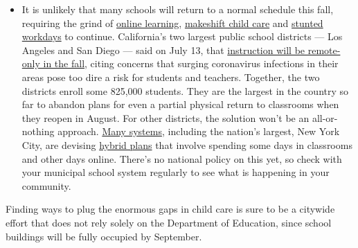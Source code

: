 \begin{itemize}
  \begin{itemize}
  \tightlist
  \item
    It is unlikely that many schools will return to a normal schedule
    this fall, requiring the grind of
    \href{https://www.nytimes3xbfgragh.onion/2020/06/05/us/coronavirus-education-lost-learning.html?action=click\&pgtype=Article\&state=default\&region=MAIN_CONTENT_3\&context=storylines_faq}{online
    learning},
    \href{https://www.nytimes3xbfgragh.onion/2020/05/29/us/coronavirus-child-care-centers.html?action=click\&pgtype=Article\&state=default\&region=MAIN_CONTENT_3\&context=storylines_faq}{makeshift
    child care} and
    \href{https://www.nytimes3xbfgragh.onion/2020/06/03/business/economy/coronavirus-working-women.html?action=click\&pgtype=Article\&state=default\&region=MAIN_CONTENT_3\&context=storylines_faq}{stunted
    workdays} to continue. California's two largest public school
    districts --- Los Angeles and San Diego --- said on July 13, that
    \href{https://www.nytimes3xbfgragh.onion/2020/07/13/us/lausd-san-diego-school-reopening.html?action=click\&pgtype=Article\&state=default\&region=MAIN_CONTENT_3\&context=storylines_faq}{instruction
    will be remote-only in the fall}, citing concerns that surging
    coronavirus infections in their areas pose too dire a risk for
    students and teachers. Together, the two districts enroll some
    825,000 students. They are the largest in the country so far to
    abandon plans for even a partial physical return to classrooms when
    they reopen in August. For other districts, the solution won't be an
    all-or-nothing approach.
    \href{https://bioethics.jhu.edu/research-and-outreach/projects/eschool-initiative/school-policy-tracker/}{Many
    systems}, including the nation's largest, New York City, are
    devising
    \href{https://www.nytimes3xbfgragh.onion/2020/06/26/us/coronavirus-schools-reopen-fall.html?action=click\&pgtype=Article\&state=default\&region=MAIN_CONTENT_3\&context=storylines_faq}{hybrid
    plans} that involve spending some days in classrooms and other days
    online. There's no national policy on this yet, so check with your
    municipal school system regularly to see what is happening in your
    community.
  \end{itemize}
\end{itemize}

Finding ways to plug the enormous gaps in child care is sure to be a
citywide effort that does not rely solely on the Department of
Education, since school buildings will be fully occupied by September.

